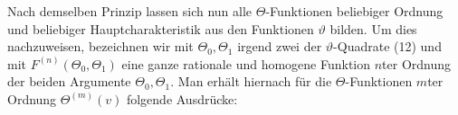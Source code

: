 Nach demselben Prinzip lassen sich nun alle $\Theta$-Funktionen
beliebiger Ordnung und beliebiger Hauptcharakteristik aus den
Funktionen $\vartheta$ bilden. Um dies nachzuweisen, bezeichnen wir mit
$\Theta_0, \Theta_1$ irgend zwei der $\vartheta$-Quadrate (12) und mit $F^{(n)}(\Theta_0,\Theta_1)$ eine
ganze rationale und homogene Funktion $n$ter Ordnung der beiden
Argumente $\Theta_0, \Theta_1$. Man erhält hiernach für die $\Theta$-Funktionen
$m$ter Ordnung $\Theta^{(m)}(v)$ folgende Ausdrücke:

